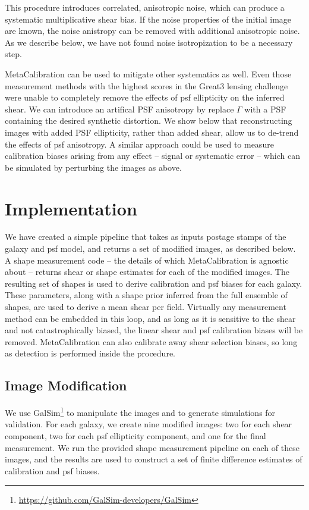 \documentclass[iop]{emulateapj}
\begin{document}
This procedure introduces correlated, anisotropic noise, which can produce a systematic multiplicative shear bias. If the noise properties of the initial image are known, the noise anistropy can be removed with additional anisotropic noise. As we describe below, we have not found noise isotropization to be a necessary step.

MetaCalibration can be used to mitigate other systematics as well. Even those measurement methods with the highest scores in the Great3 lensing challenge were unable to completely remove the effects of psf ellipticity on the inferred shear. We can introduce an artifical PSF anisotropy by replace $\Gamma$ with a PSF containing the desired synthetic distortion.  We show below that reconstructing images with added PSF ellipticity, rather than added shear, allow us to de-trend the effects of psf anisotropy. A similar approach could be used to measure calibration biases arising from any effect -- signal or systematic error --  which can be simulated by perturbing the images as above.

\section{Implementation}
We have created a simple pipeline that takes as inputs postage stamps of the galaxy and psf model, and returns a set of modified images, as described below. A shape measurement code -- the details of which MetaCalibration is agnostic about -- returns shear or shape estimates for each of the modified images. The resulting set of shapes is used to derive calibration and psf biases for each galaxy. These parameters, along with a shape prior inferred from the full ensemble of shapes, are used to derive a mean shear per field. Virtually any measurement method can be embedded in this loop, and as long as it is sensitive to the shear and not catastrophically biased, the linear shear and psf calibration biases will be removed. MetaCalibration can also calibrate away shear selection biases, so long as detection is performed inside the procedure.

\subsection{Image Modification}
We use GalSim\footnote{\url{https://github.com/GalSim-developers/GalSim}}
\citep{2015A&C....10..121R} to manipulate the images and to generate simulations for validation. For
each galaxy, we create nine modified images: two for each shear component, two for each psf
ellipticity component, and one for the final measurement. We run the provided shape measurement
pipeline on each of these images, and the results are used to construct a set of finite difference
estimates of calibration and psf biases.
\end{document}
